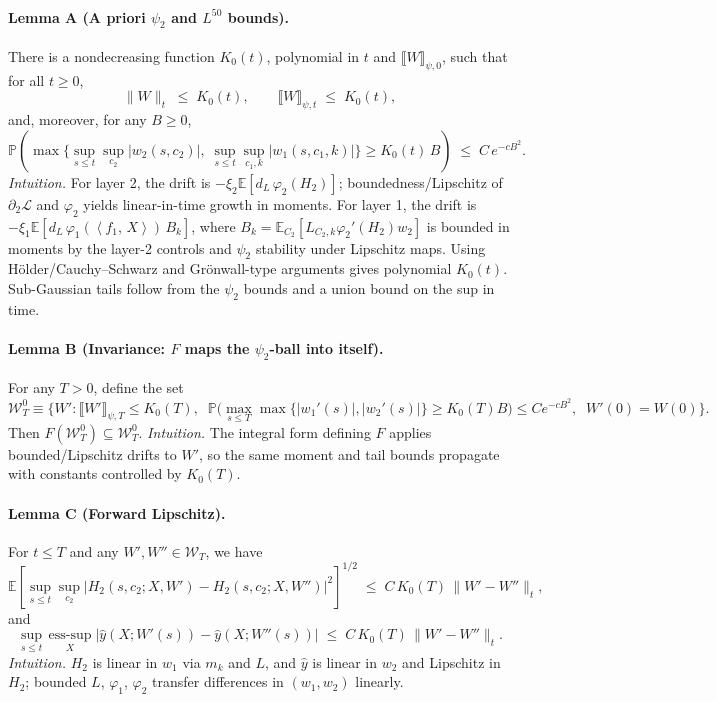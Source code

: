 \documentclass[11pt]{article}
\newcommand{\E}{\mathbb{E}}
\newcommand{\Pp}{\mathbb{P}}
\newcommand{\1}{\mathbbm{1}}
\newcommand{\ip}[2]{\left\langle #1,\,#2 \right\rangle}
\begin{document}
\paragraph{Lemma A (A priori $\psi_2$ and $L^{50}$ bounds).}
There is a nondecreasing function $K_0(t)$, polynomial in $t$ and $\llbracket W\rrbracket_{\psi,0}$, such that for all $t\ge 0$,
\[
\|W\|_t \;\le\; K_0(t),\qquad \llbracket W\rrbracket_{\psi,t} \;\le\; K_0(t),
\]
and, moreover, for any $B\ge 0$,
\[
\Pp\!\left(\max\Big\{\sup_{s\le t}\sup_{c_2}|w_2(s,c_2)|,\;\sup_{s\le t}\sup_{c_1,k}|w_1(s,c_1,k)|\Big\}\ge K_0(t)\,B\right) \;\le\; C\,e^{-c B^2}.
\]
\emph{Intuition.} For layer 2, the drift is $-\xi_2\E[d_L\,\varphi_2(H_2)]$; boundedness/Lipschitz of $\partial_2\mathcal{L}$ and $\varphi_2$ yields linear-in-time growth in moments. For layer 1, the drift is $-\xi_1\E[d_L\,\varphi_1(\ip{f_1}{X})\,B_k]$, where $B_k=\E_{C_2}[L_{C_2,k}\varphi_2'(H_2)w_2]$ is bounded in moments by the layer-2 controls and $\psi_2$ stability under Lipschitz maps. Using Hölder/Cauchy–Schwarz and Grönwall-type arguments gives polynomial $K_0(t)$. Sub-Gaussian tails follow from the $\psi_2$ bounds and a union bound on the sup in time.

\paragraph{Lemma B (Invariance: $F$ maps the $\psi_2$-ball into itself).}
For any $T>0$, define the set
\[
\mathcal{W}_T^0 \equiv \Big\{W': \llbracket W'\rrbracket_{\psi,T}\le K_0(T),\;\; \Pp\big(\max_{s\le T}\max\{|w_1'(s)|,|w_2'(s)|\}\ge K_0(T)B\big)\le C e^{-cB^2},\;\; W'(0)=W(0)\Big\}.
\]
Then $F(\mathcal{W}_T^0)\subseteq \mathcal{W}_T^0$.
\emph{Intuition.} The integral form defining $F$ applies bounded/Lipschitz drifts to $W'$, so the same moment and tail bounds propagate with constants controlled by $K_0(T)$.

\paragraph{Lemma C (Forward Lipschitz).}
For $t\le T$ and any $W',W''\in \mathcal{W}_T$, we have
\[
\E\!\left[\sup_{s\le t}\sup_{c_2}\big|H_2(s,c_2;X,W')-H_2(s,c_2;X, W'')\big|^2\right]^{\!\!1/2}\;\le\; C\,K_0(T)\,\|W'-W''\|_t,
\]
and
\[
\sup_{s\le t}\,\underset{X}{\mathrm{ess\text{-}sup}}\;\big|\hat y(X;W'(s))-\hat y(X;W''(s))\big| \;\le\; C\,K_0(T)\,\|W'-W''\|_t.
\]
\emph{Intuition.} $H_2$ is linear in $w_1$ via $m_k$ and $L$, and $\hat y$ is linear in $w_2$ and Lipschitz in $H_2$; bounded $L$, $\varphi_1$, $\varphi_2$ transfer differences in $(w_1,w_2)$ linearly.
\end{document}
